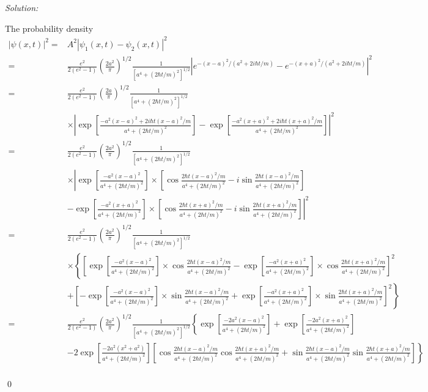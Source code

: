 \documentclass[12pt]{article}
\newenvironment{sol}
    {\emph{Solution:}
    }
    {
    \qed
    }
\begin{document}
\begin{sol}
\begin{equation}
\end{equation}
The probability density
\small\begin{align}
\nonumber|\psi(x,t)|^2=&A^2|\psi_1(x,t)-\psi_2(x,t)|^2\\
\nonumber=&\frac{e^2}{2(e^2-1)}(\frac{2a^2}{\pi})^{1/2}\frac{1}{[a^4+(2\hbar t/m)^2]^{1/2}}|e^{-(x-a)^2/(a^2+2i\hbar t/m)}-e^{-(x+a)^2/(a^2+2i\hbar t/m)}|^2\\
\nonumber=&\frac{e^2}{2(e^2-1)}(\frac{2a}{\pi})^{1/2}\frac{1}{[a^4+(2\hbar t/m)^2]^{1/2}}\\
\nonumber&\times\left|\exp\left[\frac{-a^2(x-a)^2+2i\hbar t(x-a)^2/m}{a^4+(2\hbar t/m)^2}\right]-\exp\left[\frac{-a^2(x+a)^2+2i\hbar t(x+a)^2/m}{a^4+(2\hbar t/m)^2}\right]\right|^2\\
\nonumber=&\frac{e^2}{2(e^2-1)}(\frac{2a^2}{\pi})^{1/2}\frac{1}{[a^4+(2\hbar t/m)^2]^{1/2}}\\
\nonumber&\times\left|\exp\left[\frac{-a^2(x-a)^2}{a^4+(2\hbar t/m)^2}\right]\times\left[\cos\frac{2\hbar t(x-a)^2/m}{a^4+(2\hbar t/m)^2}-i\sin\frac{2\hbar t(x-a)^2/m}{a^4+(2\hbar t/m)^2}\right]\right.\\
\nonumber&-\left.\exp\left[\frac{-a^2(x+a)^2}{a^4+(2\hbar t/m)^2}\right]\times\left[\cos\frac{2\hbar t(x+a)^2/m}{a^4+(2\hbar t/m)^2}-i\sin\frac{2\hbar t(x+a)^2/m}{a^4+(2\hbar t/m)^2}\right]\right|^2\\
\nonumber=&\frac{e^2}{2(e^2-1)}(\frac{2a^2}{\pi})^{1/2}\frac{1}{[a^4+(2\hbar t/m)^2]^{1/2}}\\
\nonumber&\times\left\{\left[\exp\left[\frac{-a^2(x-a)^2}{a^4+(2\hbar t/m)^2}\right]\times\cos\frac{2\hbar t(x-a)^2/m}{a^4+(2\hbar t/m)^2}-\exp\left[\frac{-a^2(x+a)^2}{a^4+(2\hbar t/m)^2}\right]\times\cos\frac{2\hbar t(x+a)^2/m}{a^4+(2\hbar t/m)^2}\right]^2\right.\\
\nonumber&+\left.\left[-\exp\left[\frac{-a^2(x-a)^2}{a^4+(2\hbar t/m)^2}\right]\times\sin\frac{2\hbar t(x-a)^2/m}{a^4+(2\hbar t/m)^2}+\exp\left[\frac{-a^2(x+a)^2}{a^4+(2\hbar t/m)^2}\right]\times\sin\frac{2\hbar t(x+a)^2/m}{a^4+(2\hbar t/m)^2}\right]^2\right\}\\
\nonumber=&\frac{e^2}{2(e^2-1)}(\frac{2a^2}{\pi})^{1/2}\frac{1}{[a^4+(2\hbar t/m)^2]^{1/2}}\left\{\exp\left[\frac{-2a^2(x-a)^2}{a^4+(2\hbar t/m)^2}\right]+\exp\left[\frac{-2a^2(x+a)^2}{a^4+(2\hbar t/m)^2}\right]\right.\\
\nonumber&\left.-2\exp\left[\frac{-2a^2(x^2+a^2)}{a^4+(2\hbar t/m)^2}\right]\left[\cos\frac{2\hbar t(x-a)^2/m}{a^4+(2\hbar t/m)^2}\cos\frac{2\hbar t(x+a)^2/m}{a^4+(2\hbar t/m)^2}+\sin\frac{2\hbar t(x-a)^2/m}{a^4+(2\hbar t/m)^2}\sin\frac{2\hbar t(x+a)^2/m}{a^4+(2\hbar t/m)^2}\right]\right\}\\

\end{align}
\end{sol}
\end{document}
